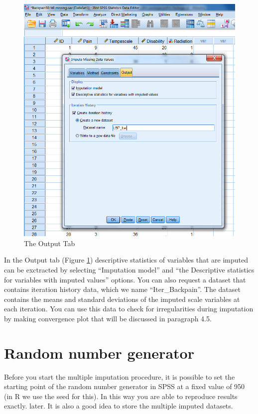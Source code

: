 \documentclass[]{book}
\begin{document}
\begin{figure}

{\centering \includegraphics[width=0.9\linewidth]{images/fig4.9} 

}

\caption{The Output Tab}\label{fig:fig4-9}
\end{figure}

In the Output tab (Figure \ref{fig:fig4-9}) descriptive statistics of
variables that are imputed can be exctracted by selecting ``Imputation
model'' and ``the Descriptive statistics for variables with imputed
values'' options. You can also request a dataset that contains iteration
history data, which we name ``Iter\_Backpain''. The dataset contains the
means and standard deviations of the imputed scale variables at each
iteration. You can use this data to check for irregularities during
imputation by making convergence plot that will be discussed in
paragraph 4.5.

\section{Random number generator}\label{random-number-generator}

Before you start the multiple imputation procedure, it is possible to
set the starting point of the random number generator in SPSS at a fixed
value of 950 (in R we use the seed for this). In this way you are able
to reproduce results exactly. later. It is also a good idea to store the
multiple imputed datasets.
\end{document}
